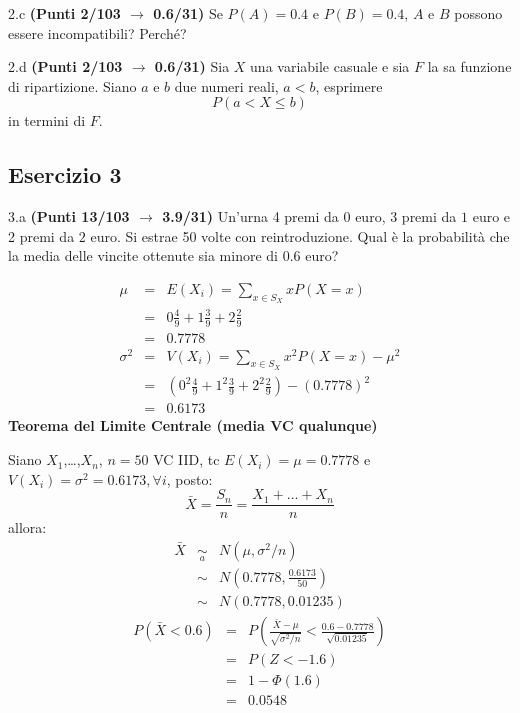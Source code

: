 \documentclass[
  11pt,
]{book}
\theoremstyle{mytheoremstyle}
\theoremstyle{mydefstyle}
\newenvironment{sol}
  {
  \begin{tcolorbox}[enhanced,breakable,arc=0.1mm,boxrule=1pt,colback=white,colframe=iblue,
  title=\bf \fontfamily{lmss}\selectfont \hspace{.5 cm} Soluzione,drop fuzzy shadow]

}{
\end{tcolorbox}
  }
\begin{document}
2.c \textbf{(Punti 2/103 \(\rightarrow\) 0.6/31)} Se \(P(A)=0.4\) e \(P(B)=0.4\), \(A\) e \(B\) possono essere incompatibili? Perché?

2.d \textbf{(Punti 2/103 \(\rightarrow\) 0.6/31)} Sia \(X\) una variabile casuale e sia \(F\) la sa funzione di ripartizione. Siano \(a\) e \(b\) due numeri reali, \(a<b\), esprimere
\[
P(a<X\leq b)
\]
in termini di \(F\).

\subsection{Esercizio 3}\label{esercizio-3-34}

3.a \textbf{(Punti 13/103 \(\rightarrow\) 3.9/31)} Un'urna 4 premi da \(\mbox{0}\) euro, 3 premi da \(\mbox{1}\) euro e 2 premi da \(\mbox{2}\) euro.
Si estrae 50 volte con reintroduzione.
Qual è la probabilità che la media delle vincite ottenute sia minore di 0.6 euro?

\begin{sol}
\begin{eqnarray*} \mu &=& E(X_i) = \sum_{x\in S_X}x P(X=x)\\ 
 &=&  0  \frac { 4 }{ 9 }+ 1  \frac { 3 }{ 9 }+ 2  \frac { 2 }{ 9 } \\ 
            &=& 0.7778 \\ 
 \sigma^2 &=& V(X_i) = \sum_{x\in S_X}x^2 P(X=x)-\mu^2\\ 
 &=&\left(  0  ^2\frac { 4 }{ 9 }+ 1  ^2\frac { 3 }{ 9 }+ 2  ^2\frac { 2 }{ 9 } \right)-( 0.7778 )^2\\ 
            &=& 0.6173 
\end{eqnarray*}
\textbf{Teorema del Limite Centrale (media VC qualunque)}

Siano \(X_1\),\ldots,\(X_n\), \(n=50\) VC IID, tc \(E(X_i)=\mu=0.7778\) e \(V(X_i)=\sigma^2=0.6173,\forall i\), posto:
\[
      \bar X=\frac{S_n}n =\frac{X_1 + ... + X_n}n
      \]
allora:\begin{eqnarray*}
  \bar X & \mathop{\sim}\limits_{a}& N(\mu,\sigma^2/n) \\
     &\sim & N\left(0.7778,\frac{0.6173}{50}\right) \\
     &\sim & N(0.7778,0.01235)
  \end{eqnarray*}\begin{eqnarray*}
      P( \bar X   <   0.6 ) 
        &=& P\left(  \frac { \bar X  -  \mu }{ \sqrt{\sigma^2/n} }  <  \frac { 0.6  -  0.7778 }{\sqrt{ 0.01235 }} \right)  \\
                 &=& P\left(  Z   <   -1.6 \right) \\    
                 &=&  1-\Phi( 1.6 ) \\ &=&  0.0548 
      \end{eqnarray*}

\end{sol}
\end{document}
